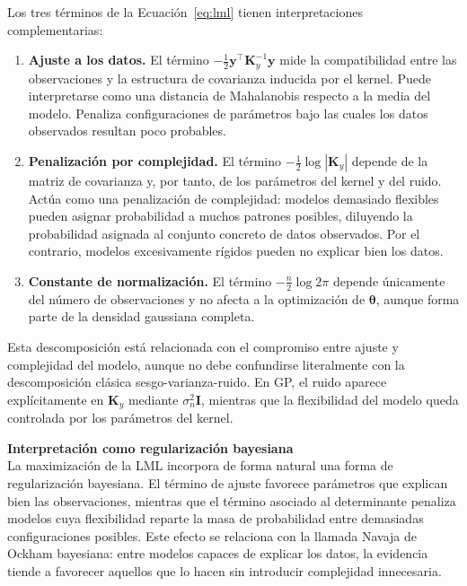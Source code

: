 Los tres términos de la Ecuación~\ref{eq:lml} tienen interpretaciones complementarias:

\begin{enumerate}
    \item \textbf{Ajuste a los datos.}
    El término
    \(
    -\frac{1}{2}\bm{y}^\top \bm{K}_y^{-1}\bm{y}
    \)
    mide la compatibilidad entre las observaciones y la estructura de covarianza inducida
    por el kernel. Puede interpretarse como una distancia de Mahalanobis respecto a la media
    del modelo. Penaliza configuraciones de parámetros bajo las cuales los datos
    observados resultan poco probables.

    \item \textbf{Penalización por complejidad.}
    El término
    \(
    -\frac{1}{2}\log|\bm{K}_y|
    \)
    depende de la matriz de covarianza y, por tanto, de los parámetros del kernel y del
    ruido. Actúa como una penalización de complejidad: modelos demasiado flexibles pueden
    asignar probabilidad a muchos patrones posibles, diluyendo la probabilidad asignada al
    conjunto concreto de datos observados. Por el contrario, modelos excesivamente rígidos
    pueden no explicar bien los datos.

    \item \textbf{Constante de normalización.}
    El término
    \(
    -\frac{n}{2}\log 2\pi
    \)
    depende únicamente del número de observaciones y no afecta a la optimización de
    \(\bm{\theta}\), aunque forma parte de la densidad gaussiana completa.
\end{enumerate}

Esta descomposición está relacionada con el compromiso entre ajuste y complejidad del
modelo, aunque no debe confundirse literalmente con la descomposición clásica
sesgo-varianza-ruido. En GP, el ruido aparece explícitamente en \(\bm{K}_y\) mediante
\(\sigma_n^2\bm{I}\), mientras que la flexibilidad del modelo queda controlada por los
parámetros del kernel.


\vspace{0.3cm}
\noindent\textbf{Interpretación como regularización bayesiana} \\

La maximización de la LML incorpora de forma natural una forma de
regularización bayesiana. El término de ajuste favorece parámetros que explican bien
las observaciones, mientras que el término asociado al determinante penaliza modelos cuya
flexibilidad reparte la masa de probabilidad entre demasiadas configuraciones posibles. Este
efecto se relaciona con la llamada Navaja de Ockham bayesiana: entre modelos capaces de
explicar los datos, la evidencia tiende a favorecer aquellos que lo hacen sin introducir
complejidad innecesaria.

